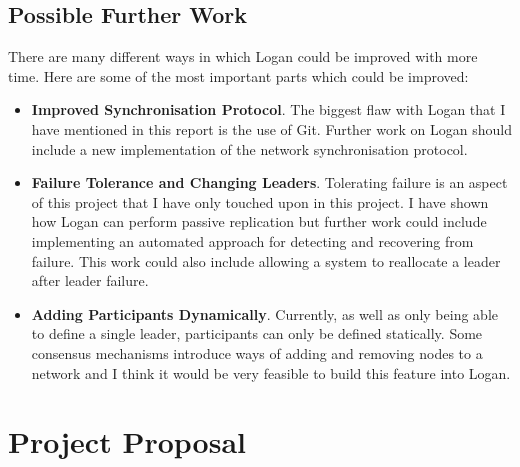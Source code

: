 \documentclass[12pt,a4paper,twoside,openright]{report}
\begin{document}
	\section{Possible Further Work}
	There are many different ways in which Logan could be improved with more time.
	Here are some of the most important parts which could be improved:
	\begin{itemize}
	\item \textbf{Improved Synchronisation Protocol}.
	The biggest flaw with Logan that I have mentioned in this report is the use of Git.
	Further work on Logan should include a new implementation of the network synchronisation protocol.
	\item \textbf{Failure Tolerance and Changing Leaders}.
	Tolerating failure is an aspect of this project that I have only touched upon in this project. 
	I have shown how Logan can perform passive replication but further work could include implementing an automated approach for detecting and recovering from failure. 
	This work could also include allowing a system to reallocate a leader after leader failure.
	\item \textbf{Adding Participants Dynamically}.
	Currently, as well as only being able to define a single leader, participants can only be defined statically. 
	Some consensus mechanisms introduce ways of adding and removing nodes to a network and I think it would be very feasible to build this feature into Logan.
	\end{itemize}

	\printbibliography
	
	\appendix

	\chapter{Project Proposal}
	
	
	
	
\end{document}
